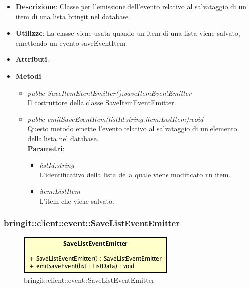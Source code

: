 \begin{itemize}
\item \textbf{Descrizione}: Classe per l'emissione dell'evento relativo al salvataggio di un item di una lista bringit nel database. 
\item \textbf{Utilizzo}: La classe viene usata quando un item di una lista viene salvato, emettendo un evento saveEventItem.
\item \textbf{Attributi}: 
\item \textbf{Metodi}:
	\begin{itemize}
	\item \textit{public SaveItemEventEmitter():SaveItemEventEmitter}\\
	Il costruttore della classe SaveItemEventEmitter.
	\item \textit{public emitSaveEventItem(listId:string,item:ListItem):void}\\
	Questo metodo emette l'evento relativo al salvataggio di un elemento della lista nel database.
					\\ \textbf{Parametri}: \begin{itemize}
			\item \textit{listId:string}\\
			L'identificativo della lista della quale viene modificato un item.
			\item \textit{item:ListItem}\\
			L'item che viene salvato.
					\end{itemize}
	\end{itemize}
\end{itemize}

\subsubsection{bringit::client::event::SaveListEventEmitter}

\label{bringit::client::event::SaveListEventEmitter}
\begin{figure}[H]
	\centering
	\includegraphics[scale=0.5]{Sezioni/SottosezioniST/img/app/SaveListEventEmitter.png}
	\caption{bringit::client::event::SaveListEventEmitter}
\end{figure}

